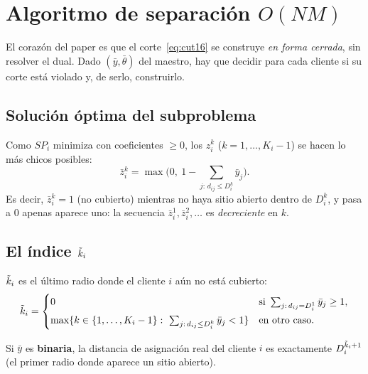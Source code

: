 \section{Algoritmo de separación \texorpdfstring{$O(NM)$}{O(NM)}}
\label{sec:separacion}

El corazón del paper es que el corte~\eqref{eq:cut16} se construye \emph{en forma cerrada}, sin
resolver el dual. Dado $(\bar y,\bar\theta)$ del maestro, hay que decidir para cada cliente si su
corte está violado y, de serlo, construirlo.

\subsection{Solución óptima del subproblema}
Como $SP_i$ minimiza con coeficientes $\ge0$, los $z^k_i$ ($k=1,\dots,K_i-1$) se hacen lo más chicos posibles:
\begin{equation}
  \bar z^k_i = \max\Big(0,\ 1-\!\!\sum_{j:\,d_{ij}\le D^k_i}\!\!\bar y_j\Big).
  \label{eq:zbar}
\end{equation}
Es decir, $\bar z^k_i=1$ (no cubierto) mientras no haya sitio abierto dentro de $D^k_i$, y pasa a
$0$ apenas aparece uno: la secuencia $\bar z^1_i,\bar z^2_i,\dots$ es \emph{decreciente} en $k$.

\subsection{El índice \texorpdfstring{$\tilde{k}_i$}{k tilde}}
\begin{definicion}
$\tilde{k}_i$ es el último radio donde el cliente $i$ aún no está cubierto:
\[
  \tilde{k}_i=\begin{cases}
    0 & \text{si } \sum_{j:\,d_{ij}=D^1_i}\bar y_j \ge 1,\\[4pt]
    \max\{k\in\{1,\dots,K_i-1\}:\ \sum_{j:\,d_{ij}\le D^k_i}\bar y_j < 1\} & \text{en otro caso.}
  \end{cases}
\]
\end{definicion}
Si $\bar y$ es \textbf{binaria}, la distancia de asignación real del cliente $i$ es exactamente
$D^{\tilde{k}_i+1}_i$ (el primer radio donde aparece un sitio abierto).

